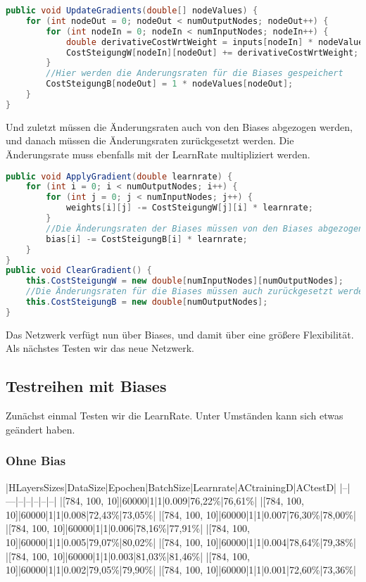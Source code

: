 \documentclass[12pt]{article}
\begin{document}
\begin{lstlisting}[language=Java]
public void UpdateGradients(double[] nodeValues) {
    for (int nodeOut = 0; nodeOut < numOutputNodes; nodeOut++) {
        for (int nodeIn = 0; nodeIn < numInputNodes; nodeIn++) {
            double derivativeCostWrtWeight = inputs[nodeIn] * nodeValues[nodeOut];
            CostSteigungW[nodeIn][nodeOut] += derivativeCostWrtWeight;
        }
        //Hier werden die Anderungsraten für die Biases gespeichert
        CostSteigungB[nodeOut] = 1 * nodeValues[nodeOut];
    }
}
\end{lstlisting}Und zuletzt  müssen die Änderungsraten auch von den Biases abgezogen werden, und danach müssen die Änderungsraten zurückgesetzt werden. Die Änderungsrate muss ebenfalls mit der LearnRate multipliziert werden.\begin{lstlisting}[language=Java]
public void ApplyGradient(double learnrate) {
    for (int i = 0; i < numOutputNodes; i++) {
        for (int j = 0; j < numInputNodes; j++) {
            weights[i][j] -= CostSteigungW[j][i] * learnrate;
        }
        //Die Änderungsraten der Biases müssen von den Biases abgezogen werden
        bias[i] -= CostSteigungB[i] * learnrate;
    }
}
public void ClearGradient() {
    this.CostSteigungW = new double[numInputNodes][numOutputNodes];
    //Die Änderungsraten für die Biases müssen auch zurückgesetzt werden
    this.CostSteigungB = new double[numOutputNodes];
}
\end{lstlisting}Das Netzwerk verfügt nun über Biases, und damit über eine größere Flexibilität. Als nächstes Testen wir das neue Netzwerk.\subsection{ Testreihen mit Biases}Zunächst einmal Testen wir die LearnRate. Unter Umständen kann sich etwas geändert haben.\subsubsection{ Ohne Bias}|HLayersSizes|DataSize|Epochen|BatchSize|Learnrate|ACtrainingD|ACtestD|
|--|---|--|--|--|--|--|
|[784, 100, 10]|60000|1|1|0.009|76,22\%|76,61\%|
|[784, 100, 10]|60000|1|1|0.008|72,43\%|73,05\%|
|[784, 100, 10]|60000|1|1|0.007|76,30\%|78,00\%|
|[784, 100, 10]|60000|1|1|0.006|78,16\%|77,91\%|
|[784, 100, 10]|60000|1|1|0.005|79,07\%|80,02\%|
|[784, 100, 10]|60000|1|1|0.004|78,64\%|79,38\%|
|[784, 100, 10]|60000|1|1|0.003|81,03\%|81,46\%|
|[784, 100, 10]|60000|1|1|0.002|79,05\%|79,90\%|
|[784, 100, 10]|60000|1|1|0.001|72,60\%|73,36\%|
\end{document}
